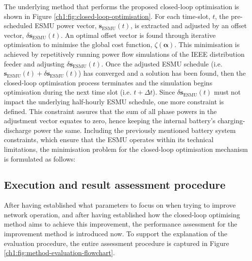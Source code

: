 


The underlying method that performs the proposed closed-loop optimisation is shown in Figure \ref{ch1:fig:closed-loop-optimisation}.
For each time-slot, $t$, the pre-scheduled ESMU power vector, $\textbf{s}_\text{ESMU}(t)$, is extracted and adjusted by an offset vector, $\delta \textbf{s}_\text{ESMU}(t)$.
An optimal offset vector is found through iterative optimisation to minimise the global cost function, $\zeta(\boldsymbol{\alpha})$.
This minimisation is achieved by repetitively running power flow simulations of the IEEE distribution feeder and adjusting $\delta\textbf{s}_\text{ESMU}(t)$.
Once the adjusted ESMU schedule (i.e. $\textbf{s}_\text{ESMU}(t) + \delta \textbf{s}_\text{ESMU}(t)$) has converged and a solution has been found, then the closed-loop optimisation process terminates and the simulation begins optimisation during the next time slot (i.e. $t+\Delta t$).
Since $\delta \textbf{s}_\text{ESMU}(t)$ must not impact the underlying half-hourly ESMU schedule, one more constraint is defined.
This constraint assures that the sum of all phase powers in the adjustment vector equates to zero, hence keeping the internal battery's charging-discharge power the same.
Including the previously mentioned battery system constraints, which ensure that the ESMU operates within its technical limitations, the minimisation problem for the closed-loop optimisation mechanism is formulated as follows:



\subsection{Execution and result assessment procedure}
\label{ch1:subsec:method-execution}

After having established what parameters to focus on when trying to improve network operation, and after having established how the closed-loop optimising method aims to achieve this improvement, the performance assessment for the improvement method is introduced now.
To support the explanation of the evaluation procedure, the entire assessment procedure is captured in Figure \ref{ch1:fig:method-evaluation-flowchart}.

